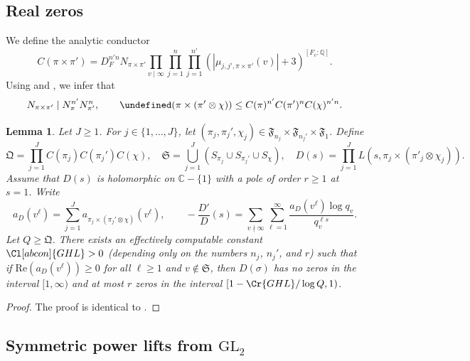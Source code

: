 \documentclass[11pt]{amsart}
\let\C\undefined
\newtheorem{lemma}[theorem]{Lemma}
\theoremstyle{remark}
\numberwithin{equation}{section}
\begin{document}
\subsection{Real zeros}
	
We define the analytic conductor
	\[
	C(\pi\times\pi')=D_F^{n'n}N_{\pi\times{\pi}'}\prod_{v\mid\infty}\prod_{j=1}^n \prod_{j=1}^{n'} (|\mu_{j,j',\pi\times{\pi}'}(v)|+3)^{[F_v:\mathbb{Q}]}.
	\]
	Using \cite[Theorem 2]{BushnellHenniart} and \cite[Lemma A.1]{Wattanawanichkul}, we infer that
	\begin{equation}
		\label{eqn:BH}
		N_{\pi\times\pi'}\mid N_{\pi}^{n'}N_{\pi'}^{n},\qquad \C(\pi\times(\pi'\otimes\chi))\leq C(\pi)^{n'}C(\pi')^{n}C(\chi)^{n'n}.
	\end{equation}

\begin{lemma}
	\label{lem:GHL}
Let $J\geq 1$.  For $j\in\{1,\ldots,J\}$, let $(\pi_j,\pi_j',\chi_j)\in\mathfrak{F}_{n_j}\times\mathfrak{F}_{n_j'}\times\mathfrak{F}_{1}$.  Define
\[
\mathfrak{Q} = \prod_{j = 1}^
   J C (\pi_j) C (\pi_j') C (\chi),\quad \mathfrak {S} = \bigcup_ {j = 1}^J (S_{\pi_j}\cup S_{\pi_j'}\cup S_{\chi}),\quad D(s) =  \prod_{j = 1}^J L(s, \pi_j\times(\pi' _j\otimes\chi_j)).
\]
Assume that $D(s)$ is holomorphic on $\mathbb{C}-\{1\}$ with a pole of order $r\geq 1$ at $s=1$.  Write
\begin{equation}
\label{eqn:aDdef}
a_D(v^{\ell})=\sum_{j=1}^J a_{\pi_j\times(\pi_j'\otimes\chi)}(v^{\ell}),\qquad -\frac{D'}{D}(s) = \sum_{v\nmid\infty}\sum_{\ell=1}^{\infty}\frac{a_D(v^{\ell})\log q_v}{q_v^{\ell s}}.
\end{equation}
Let $Q \geq \mathfrak{Q}$.  There exists an effectively computable constant $\Cl[abcon]{GHL}>0$ (depending only on the numbers $n_j$, $n_j'$, and $r$) such that if $\mathrm{Re}(a_D(v^{\ell}))\geq 0$ for all $\ell\geq 1$ and $v\notin\mathfrak{S}$, then $D(\sigma)$ has no zeros in the interval $[1,\infty)$ and at most $r$ zeros in the interval $[1-\Cr{GHL}/\log Q,1)$.
\end{lemma}
\begin{proof}
The proof is identical to \cite[Lemma 5.9]{IK}.
\end{proof}

\subsection{Symmetric power lifts from $\mathrm{GL}_2$}
\end{document}
